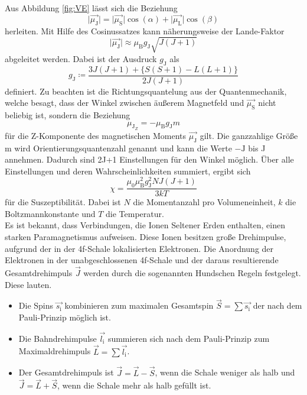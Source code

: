 Aus Abbildung \ref{fig:VE} lässt sich die Beziehung
\begin{equation}
    \lvert \vec{\mu_\text{J}} \rvert = \lvert \vec{\mu_\text{S}} \rvert \cos(\alpha) + \lvert \vec{\mu_\text{L}} \rvert \cos(\beta)
\end{equation}
herleiten. Mit Hilfe des Cosinussatzes kann näherungsweise der Lande-Faktor
\begin{equation}
    \lvert \vec{\mu_\text{J}} \rvert \approx \mu_\text{B} g_\text{J} \sqrt{J\left(J+1\right)}
\end{equation}
abgeleitet werden. Dabei ist der Ausdruck $g_\text{J}$ als
\begin{equation}
    g_\text{J} \coloneq \frac{3 J \left(J+1\right) + \{S\left(S+1\right)-L \left(L+1\right)\}}{2J\left(J+1\right)}
\end{equation}
definiert.
Zu beachten ist die Richtungsquantelung aus der Quantenmechanik, welche besagt, dass der Winkel zwischen äußerem Magnetfeld und $\vec{\mu_\text{S}}$
nicht beliebig ist, sondern die Beziehung
\begin{equation}
    \mu_{\text{J}_Z}=- \mu_\text{B} g_\text{J} m
\end{equation}
für die Z-Komponente des magnetischen Moments $\vec{\mu_\text{J}}$ gilt. Die ganzzahlige Größe m wird Orientierungsquantenzahl genannt und kann die Werte $-\text{J}$ bis J annehmen.
Dadurch sind 2J+1 Einstellungen für den Winkel möglich. 
Über alle Einstellungen und deren Wahrscheinlichkeiten summiert, ergibt sich
\begin{equation}
    \chi=\frac{\mu_0 \mu_\text{B}^2 g_\text{J}^2 N J \left(J+1\right)}{3 k T}
\end{equation}
für die Suszeptibilität. Dabei ist $N$ die Momentanzahl pro Volumeneinheit, $k$ die Boltzmannkonstante und $T$ die Temperatur.
\\
Es ist bekannt, dass Verbindungen, die Ionen Seltener Erden enthalten, einen starken Paramagnetismus aufweisen.
Diese Ionen besitzen große Drehimpulse, aufgrund der in der 4f-Schale lokalisierten Elektronen. 
Die Anordnung  der  Elektronen  in  der  unabgeschlossenen  4f-Schale  und  der  daraus  resultierende  Gesamtdrehimpuls  $\vec{J}$  werden  durch  die  sogenannten  Hundschen  Regeln  festgelegt.
Diese lauten.
\begin{itemize}
    \item Die Spins $\vec{s_\text{i}}$ kombinieren zum maximalen Gesamtspin $\vec{S}= \sum \vec{s_\text{i}}$ der nach dem Pauli-Prinzip möglich ist.
    \item Die Bahndrehimpulse $\vec{l_\text{i}}$ summieren sich nach dem Pauli-Prinzip zum Maximaldrehimpuls $\vec{L}=\sum \vec{l_\text{i}}$.
    \item Der Gesamtdrehimpuls ist $\vec{J}=\vec{L}-\vec{S}$, wenn die Schale weniger als halb und $\vec{J}=\vec{L}+\vec{S}$, wenn die Schale mehr als halb gefüllt ist.
\end{itemize}
